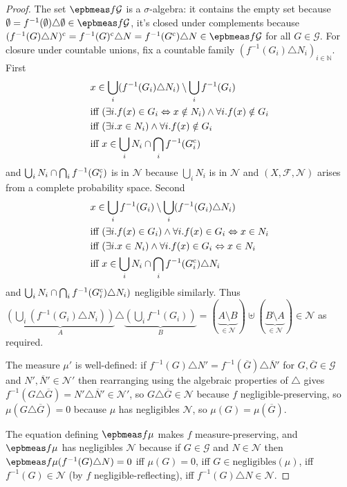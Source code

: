 \documentclass[
  sigconf,
  screen, ]{acmart}
\theoremstyle{definition}
\newcommand\calF{\mathcal F}
\newcommand\calG{\mathcal G}
\newcommand\calN{\mathcal N}
\newcommand\N{\mathbb N}
\newcommand\negligibles{\mathrm{negligibles}}
\begin{document}
\begin{proof}
  The set $\epbmeas f\calG$ is a $\sigma$-algebra:
  it contains the empty set because $\emptyset = f^{-1}(\emptyset)\triangle\emptyset\in\epbmeas f\calG$,
  it's closed under complements
  because $(f^{-1}(G)\triangle N)^{\rm c}
  = f^{-1}(G)^{\rm c}\triangle N
  = f^{-1}(G^{\rm c})\triangle N\in \epbmeas f\calG$
  for all $G\in\calG$.
  For closure under countable unions, fix a countable family $(f^{-1}(G_i)\triangle N_i)_{i\in \N}$.
  First
  \begin{align*}
    &x\in \bigcup_i (f^{-1}(G_i)\triangle N_i)\setminus \bigcup_i f^{-1}(G_i)\\
    &\text{iff } (\exists i. f(x)\in G_i\Leftrightarrow x\notin N_i)\land\forall i. f(x)\notin G_i\\
    &\text{iff } (\exists i. x\in N_i)\land\forall i. f(x)\notin G_i\\
    &\text{iff } x\in \bigcup_i N_i \cap \bigcap_i f^{-1}(G_i^{\rm c})
  \end{align*}
  and $\bigcup_i N_i \cap \bigcap_i f^{-1}(G_i^{\rm c})$
  is in $\calN$ because $\bigcup_i N_i$ is in $\calN$
  and $(X,\calF,\calN)$ arises from a complete probability space.
  Second
  \begin{align*}
    &x\in \bigcup_i f^{-1}(G_i)\setminus\bigcup_i (f^{-1}(G_i)\triangle N_i) \\
    &\text{iff } (\exists i. f(x)\in G_i)\land\forall i. f(x)\in G_i\Leftrightarrow x\in N_i \\
    &\text{iff } (\exists i. x\in N_i)\land\forall i. f(x)\in G_i\Leftrightarrow x\in N_i \\
    &\text{iff } x\in \bigcup_i N_i \cap \bigcap_i f^{-1}(G_i^{\rm c})\triangle N_i
  \end{align*}
  and $\bigcup_i N_i \cap \bigcap_i f^{-1}(G_i^{\rm c})\triangle N_i)$
  negligible similarly.
  Thus
  $
    \underbrace{\left(\bigcup_i (f^{-1}(G_i)\triangle N_i)\right)}_A
    \triangle \underbrace{\left(\bigcup_i f^{-1}(G_i)\right)}_B
    = (\underbrace{A\setminus B}_{\in\calN}) \uplus (\underbrace{B\setminus A}_{\in \calN})
    \in\calN
  $
  as required.

  The measure $\mu'$ is
  well-defined:
  if $f^{-1}(G)\triangle N' = f^{-1}(\overline G)\triangle \overline N'$
  for $G,\overline G\in\calG$ and $N',\overline N'\in\calN'$
  then rearranging using the algebraic properties of $\triangle$ gives
  $f^{-1}(G\triangle \overline G) = N'\triangle \overline N'\in \calN'$,
  so $G\triangle\overline G\in\calN$ because $f$ negligible-preserving,
  so $\mu(G\triangle\overline G) = 0$ because $\mu$ has negligibles $\calN$,
  so $\mu(G) = \mu(\overline G)$.

  The equation defining $\epbmeas f\mu$
  makes $f$ measure-preserving,
  and $\epbmeas f\mu$ has negligibles $\calN$ because
  if $G\in\calG$ and $N\in\calN$
  then $\epbmeas f\mu(f^{-1}(G)\triangle N) = 0$
  iff $\mu(G) = 0$, iff $G\in\negligibles(\mu)$,
  iff $f^{-1}(G)\in\calN$ (by $f$ negligible-reflecting),
  iff $f^{-1}(G)\triangle N\in\calN$.
\end{proof}
\end{document}
